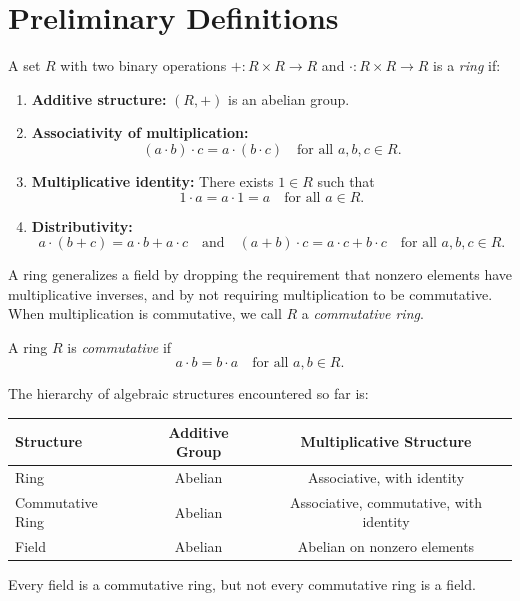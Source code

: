 
\section{Preliminary Definitions}

\begin{definition}[Ring]
A set $R$ with two binary operations $+ : R \times R \to R$
and $\cdot : R \times R \to R$ is a \emph{ring} if:

\begin{enumerate}
\item \textbf{Additive structure:}
$(R, +)$ is an abelian group.

\item \textbf{Associativity of multiplication:}
\[
(a \cdot b) \cdot c = a \cdot (b \cdot c)
\quad \text{for all } a,b,c \in R.
\]

\item \textbf{Multiplicative identity:}
There exists $1 \in R$ such that
\[
1 \cdot a = a \cdot 1 = a
\quad \text{for all } a \in R.
\]

\item \textbf{Distributivity:}
\[
a \cdot (b + c) = a \cdot b + a \cdot c
\quad \text{and} \quad
(a + b) \cdot c = a \cdot c + b \cdot c
\quad \text{for all } a,b,c \in R.
\]
\end{enumerate}
\end{definition}

\begin{remark}
A ring generalizes a field by dropping the requirement that
nonzero elements have multiplicative inverses,
and by not requiring multiplication to be commutative.
When multiplication is commutative, we call $R$ a
\emph{commutative ring}.
\end{remark}

\begin{definition}
A ring $R$ is \emph{commutative} if
\[
a \cdot b = b \cdot a
\quad \text{for all } a, b \in R.
\]
\end{definition}

\begin{remark}
The hierarchy of algebraic structures encountered so far is:

\begin{center}
\begin{tabular}{l|c|c}
Structure & Additive Group & Multiplicative Structure \\
\hline
Ring            & Abelian & Associative, with identity \\
Commutative Ring & Abelian & Associative, commutative, with identity \\
Field           & Abelian & Abelian on nonzero elements
\end{tabular}
\end{center}

Every field is a commutative ring, but not every commutative ring is a field.
\end{remark}

